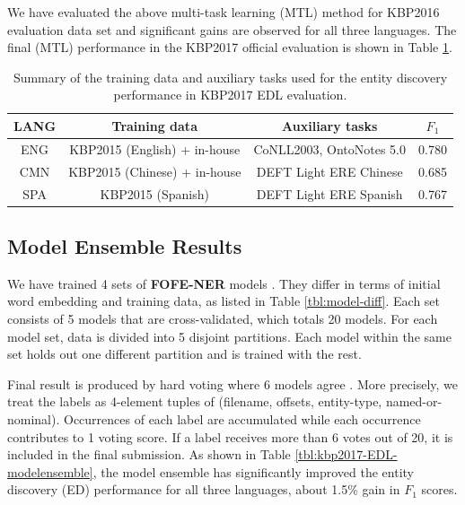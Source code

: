 \documentclass[11pt]{article}
\begin{document}
We have evaluated the above multi-task learning (MTL) method for KBP2016 evaluation data set and significant gains are observed for all three languages. The final (MTL) performance in the KBP2017 official evaluation is shown in Table \ref{tbl:summary-kbp2017-EDL4}.

\begin{table}
	\centering
	\begin{tabular}{|c|c|c|c|}
		\hline
		LANG  &  Training data   &  Auxiliary tasks  &  $F_1$ \\ \hline \hline
			ENG &   KBP2015 (English) + in-house & CoNLL2003, OntoNotes 5.0 & 0.780 \\
			CMN  &  KBP2015 (Chinese) + in-house  & DEFT Light ERE Chinese & 0.685 \\	
			SPA &  KBP2015 (Spanish) & DEFT Light ERE Spanish & 0.767 \\
      \hline
	\end{tabular}
	\caption{Summary of the training data and auxiliary tasks used for the entity discovery performance in KBP2017 EDL evaluation. }
	\label{tbl:summary-kbp2017-EDL4}	
\end{table}


\subsection{Model Ensemble Results}

We have trained 4 sets of \textbf{FOFE-NER} models \cite{xu2017local,xu2016fofe,xu2016yorknrm}.
They differ in terms of initial word embedding and training data, as listed in Table \ref{tbl:model-diff}. 
Each set consists of 5 models that are cross-validated, which totals 20 models. For each model set, data is divided into 5 disjoint partitions. Each model within the same set holds out one different partition and is trained with the rest. 

Final result is produced by hard voting where 6 models agree \cite{breiman1996bagging}. 
More precisely, we treat the labels as 4-element tuples of (filename, offsets, entity-type, named-or-nominal).
Occurrences of each label are accumulated while each occurrence contributes to 1 voting score. If a label receives more than 6 votes out of 20, it is included in the final submission. As shown in Table \ref{tbl:kbp2017-EDL-modelensemble}, the model ensemble has significantly improved the entity discovery (ED) performance for all three languages, about 1.5\% gain in $F_1$ scores. 
\end{document}
